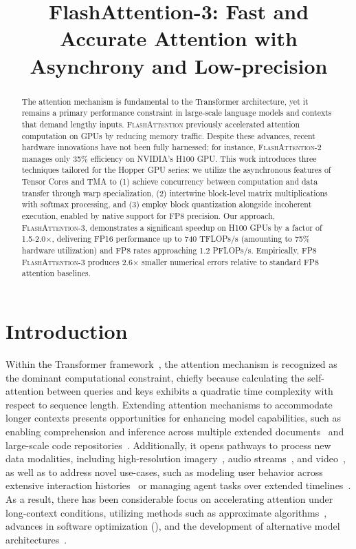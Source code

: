 \title{FlashAttention-3: Fast and Accurate Attention with Asynchrony and Low-precision}

\begin{abstract}
The attention mechanism is fundamental to the Transformer architecture, yet it remains a primary performance constraint in large-scale language models and contexts that demand lengthy inputs. \textsc{FlashAttention} previously accelerated attention computation on GPUs by reducing memory traffic. Despite these advances, recent hardware innovations have not been fully harnessed; for instance, \textsc{FlashAttention-2} manages only 35\% efficiency on NVIDIA’s H100 GPU. This work introduces three techniques tailored for the Hopper GPU series: we utilize the asynchronous features of Tensor Cores and TMA to (1) achieve concurrency between computation and data transfer through warp specialization, (2) intertwine block-level matrix multiplications with softmax processing, and (3) employ block quantization alongside incoherent execution, enabled by native support for FP8 precision. Our approach, \textsc{FlashAttention-3}, demonstrates a significant speedup on H100 GPUs by a factor of 1.5-2.0$\times$, delivering FP16 performance up to 740 TFLOPs/s (amounting to 75\% hardware utilization) and FP8 rates approaching 1.2 PFLOPs/s. Empirically, FP8 \textsc{FlashAttention-3} produces 2.6$\times$ smaller numerical errors relative to standard FP8 attention baselines.
\end{abstract}

\section{Introduction}
\label{sec:intro}

Within the Transformer framework~\citep{vaswani2017attention}, the attention mechanism is recognized as the dominant computational constraint, chiefly because calculating the self-attention between queries and keys exhibits a quadratic time complexity with respect to sequence length. Extending attention mechanisms to accommodate longer contexts presents opportunities for enhancing model capabilities, such as enabling comprehension and inference across multiple extended documents~\citep{guo2021longt5,shaham2022scrolls,peng2023yarn} and large-scale code repositories~\citep{roziere2023code, li2023starcoder}. Additionally, it opens pathways to process new data modalities, including high-resolution imagery~\citep{chen2022scaling}, audio streams~\citep{gulati2020conformer}, and video~\citep{ho2022video}, as well as to address novel use-cases, such as modeling user behavior across extensive interaction histories~\citep{sun2019bert4rec} or managing agent tasks over extended timelines~\citep{yao2022react}. As a result, there has been considerable focus on accelerating attention under long-context conditions, utilizing methods such as approximate algorithms~\citep{katharopoulos2020transformers,choromanski2020rethinking, tay2020efficient}, advances in software optimization (\citep{rabe2021self,dao2022flashattention,kwon2023efficient}), and the development of alternative model architectures~\citep{peng2023rwkv,sun2023retentive,gu2023mamba}.

